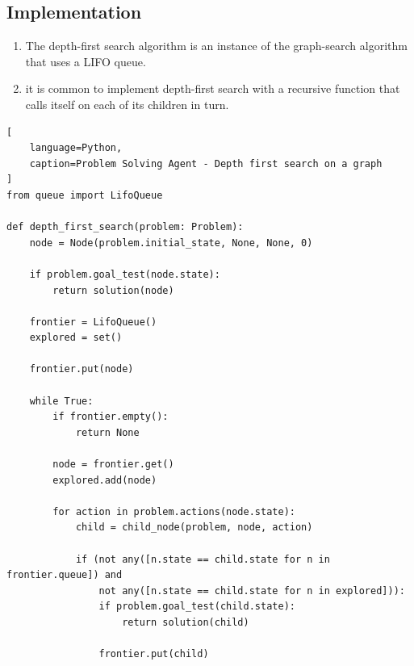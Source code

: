\subsection*{Implementation}

\begin{enumerate}
    \item The depth-first search algorithm is an instance of the graph-search algorithm that uses a LIFO queue.
    \hfill \cite{ai/book/Artificial-Intelligence-A-Modern-Approach/Russell-Norvig}

    \item  it is common to implement depth-first search with a recursive function that calls itself  on each of its children in turn. 
    \hfill \cite{ai/book/Artificial-Intelligence-A-Modern-Approach/Russell-Norvig}
\end{enumerate}

\begin{lstlisting}[
    language=Python,
    caption=Problem Solving Agent - Depth first search on a graph
]
from queue import LifoQueue

def depth_first_search(problem: Problem):
    node = Node(problem.initial_state, None, None, 0)

    if problem.goal_test(node.state):
        return solution(node)
    
    frontier = LifoQueue()
    explored = set()

    frontier.put(node)

    while True:
        if frontier.empty():
            return None
        
        node = frontier.get()
        explored.add(node)

        for action in problem.actions(node.state):
            child = child_node(problem, node, action)

            if (not any([n.state == child.state for n in frontier.queue]) and 
                not any([n.state == child.state for n in explored])):
                if problem.goal_test(child.state):
                    return solution(child)

                frontier.put(child)
\end{lstlisting}














